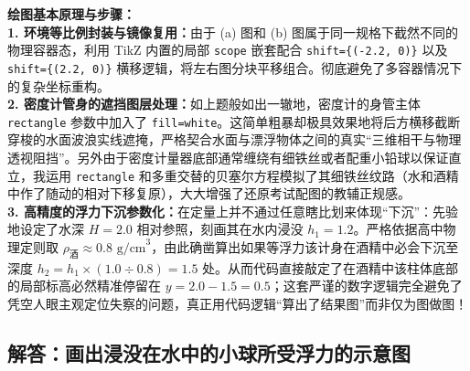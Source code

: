 {\small\color{blue!70!black}
\textbf{绘图基本原理与步骤：}\\
\textbf{1. 环境等比例封装与镜像复用：}由于 (a) 图和 (b) 图属于同一规格下截然不同的物理容器态，利用 TikZ 内置的局部 \texttt{scope} 嵌套配合 \texttt{shift=\{(-2.2, 0)\}} 以及 \texttt{shift=\{(2.2, 0)\}} 横移逻辑，将左右图分块平移组合。彻底避免了多容器情况下的复杂坐标重构。\\
\textbf{2. 密度计管身的遮挡图层处理：}如上题般如出一辙地，密度计的身管主体 \texttt{rectangle} 参数中加入了 \texttt{fill=white}。这简单粗暴却极具效果地将后方横移截断穿梭的水面波浪实线遮掩，严格契合水面与漂浮物体之间的真实“三维相干与物理透视阻挡”。另外由于密度计量器底部通常缠绕有细铁丝或者配重小铅球以保证直立，我运用 \texttt{rectangle} 和多重交替的贝塞尔方程模拟了其细铁丝纹路（水和酒精中作了随动的相对下移复原），大大增强了还原考试配图的教辅正规感。\\
\textbf{3. 高精度的浮力下沉参数化：}在定量上并不通过任意瞎比划来体现“下沉”：先验地设定了水深 $H=2.0$ 相对参照，刻画其在水内浸没 $h_1 = 1.2$。严格依据高中物理定则取 $\rho_{\text{酒}} \approx 0.8\text{ g/cm}^3$，由此确凿算出如果等浮力该计身在酒精中必会下沉至深度 $h_2 = h_1 \times (1.0 \div 0.8) = 1.5$ 处。从而代码直接敲定了在酒精中该柱体底部的局部标高必然精准停留在 $y = 2.0 - 1.5 = 0.5$；这套严谨的数字逻辑完全避免了凭空人眼主观定位失察的问题，真正用代码逻辑“算出了结果图”而非仅为图做图！
}

\vspace{1.0cm}


\newpage

\subsection{解答：画出浸没在水中的小球所受浮力的示意图}

\vspace{0.6cm}

